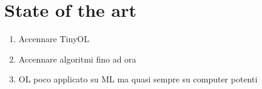 
\chapter{State of the art} 



\begin{enumerate}
  \item Accennare TinyOL
  \item Accennare algoritmi fino ad ora
  \item OL poco applicato su ML ma quasi sempre su computer potenti

\end{enumerate}



